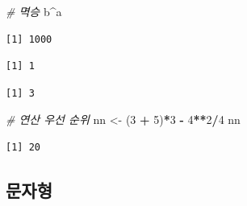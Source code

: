 \documentclass[
  11pt,
]{krantz}
\newenvironment{Shaded}{\begin{snugshade}}{\end{snugshade}}
\newcommand{\CommentTok}[1]{\textcolor[rgb]{0.37,0.37,0.37}{\textit{#1}}}
\newcommand{\DecValTok}[1]{\textcolor[rgb]{0.06,0.06,0.06}{#1}}
\newcommand{\NormalTok}[1]{#1}
\newcommand{\OperatorTok}[1]{\textcolor[rgb]{0.43,0.43,0.43}{\textbf{#1}}}
\newcommand{\StringTok}[1]{\textcolor[rgb]{0.5,0.5,0.5}{#1}}
\begin{document}
\begin{Shaded}
\begin{Highlighting}[]
\CommentTok{# 멱승}
\NormalTok{b}\OperatorTok{^}\NormalTok{a}
\end{Highlighting}
\end{Shaded}

\begin{verbatim}
[1] 1000
\end{verbatim}

\begin{Shaded}
\end{Shaded}

\begin{verbatim}
[1] 1
\end{verbatim}

\begin{Shaded}
\end{Shaded}

\begin{verbatim}
[1] 3
\end{verbatim}

\begin{Shaded}
\begin{Highlighting}[]
\CommentTok{# 연산 우선 순위}
\NormalTok{nn <-}\StringTok{ }\NormalTok{(}\DecValTok{3} \OperatorTok{+}\StringTok{ }\DecValTok{5}\NormalTok{)}\OperatorTok{*}\DecValTok{3} \OperatorTok{-}\StringTok{ }\DecValTok{4}\OperatorTok{**}\DecValTok{2}\OperatorTok{/}\DecValTok{4}
\NormalTok{nn}
\end{Highlighting}
\end{Shaded}

\begin{verbatim}
[1] 20
\end{verbatim}

\normalsize

\hypertarget{character}{%
\subsection{문자형}\label{character}}
\end{document}
